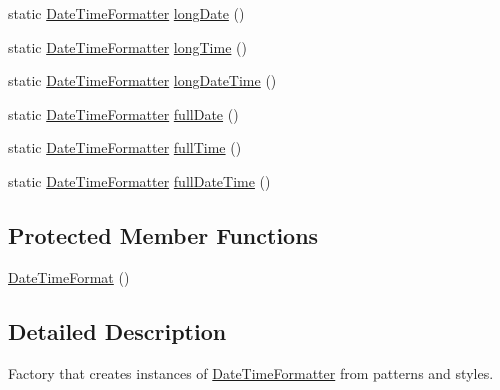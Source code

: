 \begin{DoxyCompactItemize}
\item 
static \hyperlink{classorg_1_1joda_1_1time_1_1format_1_1_date_time_formatter}{Date\-Time\-Formatter} \hyperlink{classorg_1_1joda_1_1time_1_1format_1_1_date_time_format_a93fd1a59218031f5612a67f813ce890d}{long\-Date} ()
\item 
static \hyperlink{classorg_1_1joda_1_1time_1_1format_1_1_date_time_formatter}{Date\-Time\-Formatter} \hyperlink{classorg_1_1joda_1_1time_1_1format_1_1_date_time_format_af8f8748e4233a11609d0f1d5877d0450}{long\-Time} ()
\item 
static \hyperlink{classorg_1_1joda_1_1time_1_1format_1_1_date_time_formatter}{Date\-Time\-Formatter} \hyperlink{classorg_1_1joda_1_1time_1_1format_1_1_date_time_format_ac8a32fe6ca0d4ce12489718823ca03c7}{long\-Date\-Time} ()
\item 
static \hyperlink{classorg_1_1joda_1_1time_1_1format_1_1_date_time_formatter}{Date\-Time\-Formatter} \hyperlink{classorg_1_1joda_1_1time_1_1format_1_1_date_time_format_add07cbbe829e524922d7e7dbe40cdb3a}{full\-Date} ()
\item 
static \hyperlink{classorg_1_1joda_1_1time_1_1format_1_1_date_time_formatter}{Date\-Time\-Formatter} \hyperlink{classorg_1_1joda_1_1time_1_1format_1_1_date_time_format_aa8afb153e9ed014bead999bcba33b372}{full\-Time} ()
\item 
static \hyperlink{classorg_1_1joda_1_1time_1_1format_1_1_date_time_formatter}{Date\-Time\-Formatter} \hyperlink{classorg_1_1joda_1_1time_1_1format_1_1_date_time_format_a674dbf18826aa7ef1cb7c28e95bc7872}{full\-Date\-Time} ()
\end{DoxyCompactItemize}
\subsection*{Protected Member Functions}
\begin{DoxyCompactItemize}
\item 
\hyperlink{classorg_1_1joda_1_1time_1_1format_1_1_date_time_format_af283996ed2f6013718d1e7e21a83d4bc}{Date\-Time\-Format} ()
\end{DoxyCompactItemize}


\subsection{Detailed Description}
Factory that creates instances of \hyperlink{classorg_1_1joda_1_1time_1_1format_1_1_date_time_formatter}{Date\-Time\-Formatter} from patterns and styles. 

